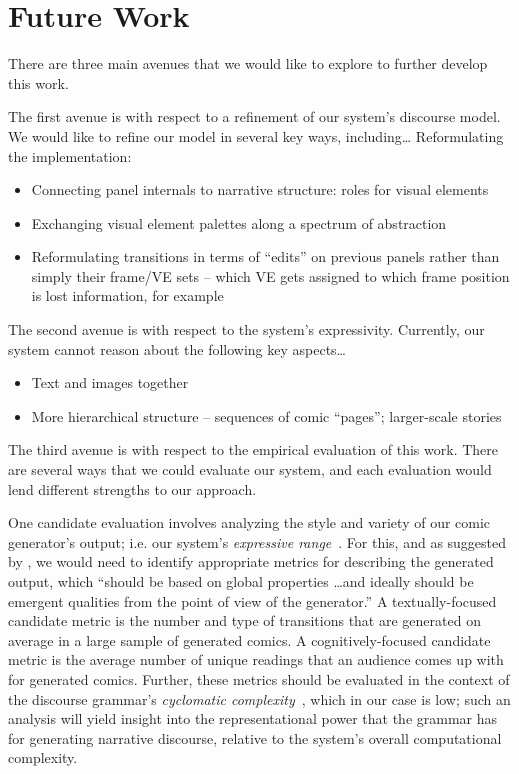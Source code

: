 \section{Future Work}

There are three main avenues that we would like to explore to further develop
this work.

The first avenue is with respect to a refinement of our system's discourse 
model. We would like to refine our model in several key ways, including\ldots
Reformulating the implementation:
\begin{itemize}
\item Connecting panel internals to narrative structure: roles for visual
elements
\item Exchanging visual element palettes along a spectrum of abstraction
\item Reformulating transitions in terms of ``edits'' on previous panels
rather than simply their frame/VE sets -- which VE gets assigned to which
frame position is lost information, for example
\end{itemize}

The second avenue is with respect to the system's expressivity. Currently, our
system cannot reason about the following key aspects\ldots
\begin{itemize}
\item Text and images together
\item More hierarchical structure -- sequences of comic ``pages'';
larger-scale stories
\end{itemize}

The third avenue is with respect to the empirical evaluation of this work.
There are several ways that we could evaluate our system, and each evaluation
would lend different strengths to our approach. 

One candidate evaluation involves analyzing the style and variety of our
comic generator's output; i.e. our system's 
\emph{expressive range}~\cite{smith2010analyzing}. For this, and as
suggested by \citeauthor{smith2010analyzing}, we would need to identify
appropriate metrics for describing the generated output, which ``should be
based on global properties \ldots and ideally should be emergent qualities
from the point of view of the generator.'' A textually-focused candidate 
metric is the number and type of transitions that are generated on average
in a large sample of generated comics. A cognitively-focused candidate
metric is the average number of unique readings that an audience comes up
with for generated comics. Further, these metrics should be evaluated in
the context of the discourse grammar's \emph{cyclomatic complexity}~\cite{mccabe1976complexity}, which in our case is low; such an analysis
will yield insight into the representational power that the grammar has
for generating narrative discourse, relative to the system's overall
computational complexity.

